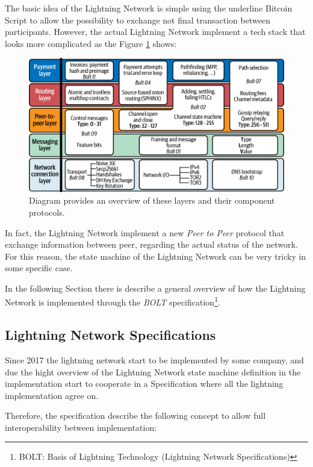 The basic idea of the Lightning Network is simple using the underline Bitcoin Script to allow the possibility to exchange
not final transaction between participants. However, the actual Lightning Network implement a tech stack that looks more complicated
as the Figure \ref{fig:lightning-stack} shows:

\begin{figure}[h]
  \begin{center}
  \includegraphics[width=0.6\columnwidth]{imgs/mtln_0601.png}
  \end{center}
  \caption{Diagram provides an overview of these layers and their component protocols.}
  \label{fig:lightning-stack}
\end{figure}

In fact, the Lightning Network implement a new \emph{Peer to Peer} protocol that exchange information between
peer, regarding the actual status of the network. For this reason, the state machine of the Lightning Network
can be very tricky in some specific case.

In the following Section there is describe a general overview of how the Lightning Network is implemented through the
\emph{BOLT} specification\footnote{BOLT: Basis of Lightning Technology (Lightning Network Specifications)}.

\subsection{Lightning Network Specifications}

Since 2017 the lightning network start to be implemented by some company,
and due the hight overview of the Lightning Network state machine definition in \cite{lightning-network-paper}
the implementation start to cooperate in a Specification where all the lightning implementation agree on.

Therefore, the specification describe the following concept to allow full interoperability between implementation:


